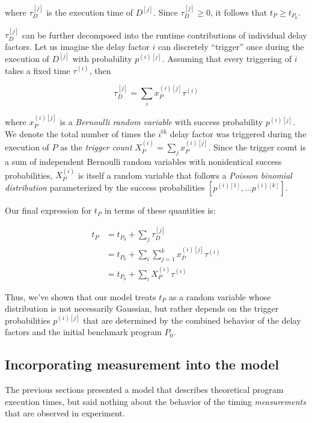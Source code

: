 \documentclass[conference]{IEEEtran}
\begin{document}
where $\tau^{[j]}_D$ is the execution time of $D^{[j]}$. Since $\tau^{[j]}_D \ge 0$, it
follows that $t_P \ge t_{P_0}$.

$\tau^{[j]}_D$ can be further decomposed into the runtime contributions of individual delay
factors. Let us imagine the delay factor $i$ can discretely ``trigger'' once during the
execution of $D^{[j]}$ with probability $p^{(i)[j]}$. Assuming that every triggering of $i$
takes a fixed time $\tau^{(i)}$, then

\begin{equation}
    \tau^{[j]}_D = \sum_{i} x_P^{(i)[j]} \tau^{(i)}
\end{equation}

where $x_P^{(i)[j]}$ is a \textit{Bernoulli random variable} with success probability
$p^{(i)[j]}$. We denote the total number of times the $i^{\textrm{th}}$ delay factor was
triggered during the execution of $P$ as the \textit{trigger count} $X_P^{(i)} = \sum_{j}
x_P^{(i)[j]}$. Since the trigger count is a sum of independent Bernoulli random variables with
nonidentical success probabilities, $X_P^{(i)}$ is itself a random variable that follows a
\textit{Poisson binomial distribution} parameterized by the success probabilities
$\left[p^{(i)[1]}, \dots p^{(i)[k]}\right]$.

Our final expression for $t_P$ in terms of these quantities is:

\begin{align}
t_P &= t_{P_0} + \sum_{j} \tau^{[j]}_D \\ \nonumber
    &= t_{P_0} + \sum_{i} \sum_{j=1}^{k} x_P^{(i)[j]} \tau^{(i)} \\ \nonumber
    &= t_{P_0} + \sum_{i} X_P^{(i)} \tau^{(i)}
\end{align}

Thus, we've shown that our model treats $t_P$ as a random variable whose distribution is not
necessarily Gaussian, but rather depends on the trigger probabilities $p^{(i)[j]}$ that are
determined by the combined behavior of the delay factors and the initial benchmark program
$P_0$.

\subsection{Incorporating measurement into the model}

The previous sections presented a model that describes theoretical program execution times,
but said nothing about the behavior of the timing \textit{measurements} that are observed in
experiment.
\end{document}
